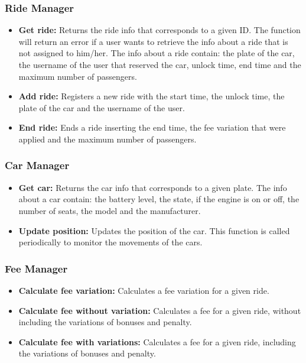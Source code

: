 \subsubsection{Ride Manager}
\begin{itemize}
	\item \textbf{Get ride:} Returns the ride info that corresponds to a given ID. The function will return an error if a user wants to retrieve the info about a ride that is not assigned to him/her.
	The info about a ride contain: the plate of the car, the username of the user that reserved the car, unlock time, %
	end time and the maximum number of passengers.
	\item \textbf{Add ride:} Registers a new ride with the start time, the unlock time, %
the plate of the car and the username of the user.
	\item \textbf{End ride:} Ends a ride inserting the end time, the fee variation that were applied and the maximum number of passengers.
\end{itemize}

\subsubsection{Car Manager}
\begin{itemize}
	\item \textbf{Get car:} Returns the car info that corresponds to a given plate.
	The info about a car contain: the battery level, the state, if the engine is on or off, the number of seats,  the model and the manufacturer.
	\item \textbf{Update position:} Updates the position of the car. This function is called periodically to monitor the movements of the cars.
\end{itemize}

\subsubsection{Fee Manager}
\begin{itemize}
	\item \textbf{Calculate fee variation:} Calculates a fee variation for a given ride. 
	\item \textbf{Calculate fee without variation:} Calculates a fee for a given ride, without including the variations of bonuses and penalty.
	\item \textbf{Calculate fee with variations:} Calculates a fee for a given ride, including the variations of bonuses and penalty.
\end{itemize}


